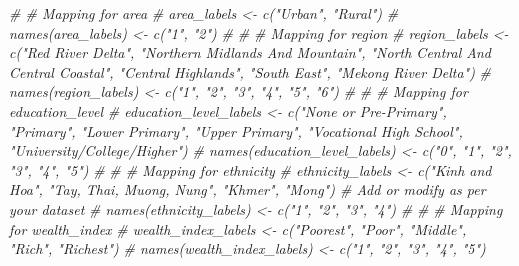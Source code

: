 \documentclass[
]{article}
\newenvironment{Shaded}{\begin{snugshade}}{\end{snugshade}}
\newcommand{\AttributeTok}[1]{\textcolor[rgb]{0.13,0.29,0.53}{#1}}
\newcommand{\CommentTok}[1]{\textcolor[rgb]{0.56,0.35,0.01}{\textit{#1}}}
\newcommand{\ConstantTok}[1]{\textcolor[rgb]{0.56,0.35,0.01}{#1}}
\newcommand{\FunctionTok}[1]{\textcolor[rgb]{0.13,0.29,0.53}{\textbf{#1}}}
\newcommand{\NormalTok}[1]{#1}
\newcommand{\OtherTok}[1]{\textcolor[rgb]{0.56,0.35,0.01}{#1}}
\newcommand{\SpecialCharTok}[1]{\textcolor[rgb]{0.81,0.36,0.00}{\textbf{#1}}}
\begin{document}
\begin{Shaded}
\begin{Highlighting}[]
\CommentTok{\# \# Mapping for \textquotesingle{}area\textquotesingle{}}
\CommentTok{\# area\_labels \textless{}{-} c("Urban", "Rural")}
\CommentTok{\# names(area\_labels) \textless{}{-} c("1", "2")}
\CommentTok{\# }
\CommentTok{\# \# Mapping for \textquotesingle{}region\textquotesingle{}}
\CommentTok{\# region\_labels \textless{}{-} c("Red River Delta", "Northern Midlands And Mountain", "North Central And Central Coastal", "Central Highlands", "South East", "Mekong River Delta")}
\CommentTok{\# names(region\_labels) \textless{}{-} c("1", "2", "3", "4", "5", "6")}
\CommentTok{\# }
\CommentTok{\# \# Mapping for \textquotesingle{}education\_level\textquotesingle{}}
\CommentTok{\# education\_level\_labels \textless{}{-} c("None or Pre{-}Primary", "Primary", "Lower Primary", "Upper Primary", "Vocational High School", "University/College/Higher")}
\CommentTok{\# names(education\_level\_labels) \textless{}{-} c("0", "1", "2", "3", "4", "5") }
\CommentTok{\# }
\CommentTok{\# \# Mapping for \textquotesingle{}ethnicity\textquotesingle{}}
\CommentTok{\# ethnicity\_labels \textless{}{-} c("Kinh and Hoa", "Tay, Thai, Muong, Nung", "Khmer", "Mong")  \# Add or modify as per your dataset}
\CommentTok{\# names(ethnicity\_labels) \textless{}{-} c("1", "2", "3", "4")  }
\CommentTok{\# }
\CommentTok{\# \# Mapping for \textquotesingle{}wealth\_index\textquotesingle{}}
\CommentTok{\# wealth\_index\_labels \textless{}{-} c("Poorest", "Poor", "Middle", "Rich", "Richest")}
\CommentTok{\# names(wealth\_index\_labels) \textless{}{-} c("1", "2", "3", "4", "5") }
\end{Highlighting}
\end{Shaded}

\begin{Shaded}
\end{Shaded}
\end{document}
